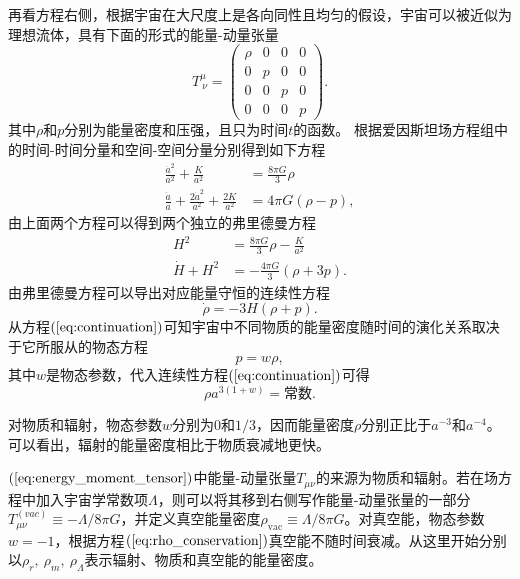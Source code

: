 再看方程右侧，根据宇宙在大尺度上是各向同性且均匀的假设，宇宙可以被近似为理想流体，具有下面的形式的能量-动量张量
\begin{equation}
    \label{eq:energy_moment_tensor}
    T^{\mu}_{\ \nu} =
    \begin{pmatrix}
        \rho & 0 & 0 & 0 \\
        0 & p & 0 & 0 \\
        0 & 0 & p & 0 \\
        0 & 0 & 0 & p
    \end{pmatrix}.
\end{equation}
其中$\rho$和$p$分别为能量密度和压强，且只为时间$t$的函数。
根据爱因斯坦场方程组中的时间-时间分量和空间-空间分量分别得到如下方程
\begin{align}
    \label{eq:00_einstein} 
    \frac{\dot{a}^2}{a^2} + \frac{K}{a^2} &= \frac{8\pi G}{3} \rho \\
    \label{eq:ij_einstein}
    \frac{\ddot{a}}{a}+\frac{2\dot{a}^2}{a^2}+\frac{2K}{a^2}&= 4\pi G(\rho-p),
\end{align}
由上面两个方程可以得到两个独立的弗里德曼方程
\begin{align}
    \label{eq:1st_friedmann_equation}
    H^2 &= \frac{8\pi G}{3} \rho -
    \frac{K}{a^2} \\
    \label{eq:accelaration_equation}
    \dot{H} + H^2 &= -\frac{4\pi G}{3}\left(\rho +
    3p\right).
\end{align}
由弗里德曼方程可以导出对应能量守恒的连续性方程
\begin{equation}\label{eq:continuation}
    \dot{\rho}=-3H\left(\rho+p\right).
\end{equation}
从方程$(\ref{eq:continuation})$可知宇宙中不同物质的能量密度随时间的演化关系取决于它所服从的物态方程
\begin{equation}
    \label{eq:state_equation}
    p=w\rho,
\end{equation}
其中$w$是物态参数，代入连续性方程$(\ref{eq:continuation})$可得
\begin{equation}
    \label{eq:rho_conservation}
    \rho a^{3(1+w)} =\text{常数}.
\end{equation}

对物质和辐射，物态参数$w$分别为$0$和$1/3$，因而能量密度$\rho$分别正比于$a^{-3}$和$a^{-4}$。可以看出，辐射的能量密度相比于物质衰减地更快。

$(\ref{eq:energy_moment_tensor})$中能量-动量张量$T_{\mu\nu}$的来源为物质和辐射。若在场方程中加入宇宙学常数项$\Lambda$，则可以将其移到右侧写作能量-动量张量的一部分$T^{(vac)}_{\mu\nu}\equiv-\Lambda/{8\pi
G}$，并定义真空能量密度$\rho_{\text{vac}}\equiv\Lambda/{8\pi G}$。对真空能，物态参数$w=-1$，根据方程$(\ref{eq:rho_conservation})$真空能不随时间衰减。从这里开始分别以$\rho_r,\
\rho_m,\ \rho_{\Lambda}$表示辐射、物质和真空能的能量密度。

